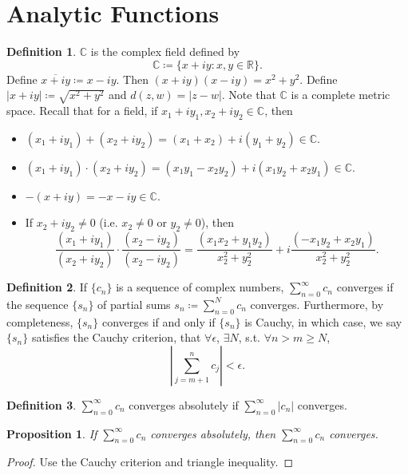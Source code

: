 \documentclass[12pt]{article}
\theoremstyle{plain}
\newtheorem*{prop}{Proposition}
\theoremstyle{definition}
\newtheorem*{defn}{Definition}
\begin{document}
\section*{Analytic Functions}
\begin{defn}
    $\mathbb{C}$ is the complex field defined by
    $$\mathbb{C}\coloneqq\{x+iy:x,y\in\mathbb{R}\}.$$
    Define $\overline{x+iy}\coloneqq x-iy$.
    Then $(x+iy)(x-iy) = x^2+y^2$.
    Define $|x+iy|\coloneqq \sqrt{x^2+y^2}$
    and $d(z,w)=|z-w|$.
    Note that $\mathbb{C}$ is a complete metric space.
    Recall that for a field, if $x_1+iy_1,x_2+iy_2\in\mathbb{C}$, then
    \begin{itemize}
        \item $(x_1+iy_1)+(x_2+iy_2) = (x_1+x_2) + i(y_1+y_2)\in\mathbb{C}$.
        \item $(x_1+iy_1)\cdot(x_2+iy_2) =
        (x_1y_1-x_2y_2)+i(x_1y_2+x_2y_1)\in\mathbb{C}$.
        \item $-(x+iy) = -x-iy\in\mathbb{C}$.
        \item If $x_2+iy_2\neq 0$ (i.e. $x_2\neq 0$ or $y_2\neq 0$), then
        $$\frac{(x_1+iy_1)}{(x_2+iy_2)}\cdot\frac{(x_2-iy_2)}{(x_2-iy_2)}
        =\frac{(x_1x_2+y_1y_2)}{x_2^2+y_2^2}+i\frac{(-x_1y_2+x_2y_1)}{x_2^2+y_2^2}.$$
    \end{itemize}
\end{defn}
\begin{defn}
    If $\{c_n\}$ is a sequence of complex numbers, $\sum_{n=0}^\infty c_n$
    converges if the sequence $\{s_n\}$ of partial sums
    $s_n\coloneqq\sum_{n=0}^N c_n$ converges.
    Furthermore, by completeness, $\{s_n\}$ converges if and only if $\{s_n\}$
    is Cauchy, in which case, we say $\{s_n\}$ satisfies the Cauchy criterion,
    that $\forall \epsilon$, $\exists N$, s.t. $\forall n>m\geq N$,
    $$\left|\sum_{j=m+1}^n c_j\right|<\epsilon.$$
\end{defn}

\begin{defn}
    $\sum_{n=0}^\infty c_n$ converges absolutely if $\sum_{n=0}^\infty |c_n|$
    converges.
\end{defn}

\begin{prop}
    If $\sum_{n=0}^\infty c_n$ converges absolutely, then $\sum_{n=0}^\infty
    c_n$ converges.
\end{prop}
\begin{proof}
    Use the Cauchy criterion and triangle inequality.
\end{proof}
\end{document}
